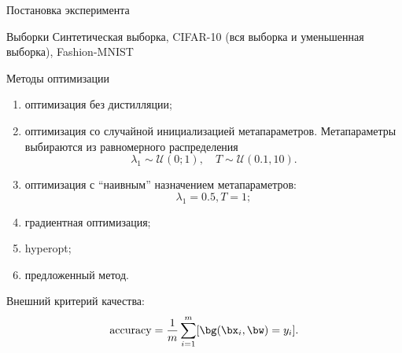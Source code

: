 \documentclass[12pt, aspectratio=169]{beamer}
\begin{document}




\begin{frame}{Постановка эксперимента}
    

\vspace{-0.35 cm}
\begin{block}{Выборки}
    Синтетическая выборка, CIFAR-10 (вся выборка и уменьшенная выборка), Fashion-MNIST
\end{block}

\vspace{-0.2 cm}
\begin{block}{Методы оптимизации}
\fontsize{11}{5}\selectfont
\begin{enumerate}[{1)}]
    \item оптимизация без дистилляции;
    \item оптимизация со случайной инициализацией метапараметров. Метапараметры выбираются из равномерного распределения
    \vspace{-0.3 cm}
    $$\lambda_1 \sim \mathcal{U}(0;1), \quad T \sim \mathcal{U}(0.1, 10).$$
    \vspace{-0.7 cm}
    \item оптимизация с ``наивным'' назначением метапараметров:
    \vspace{-0.3 cm}
    $$\lambda_1 = 0.5, T = 1;$$
    \vspace{-0.7 cm}
    \item градиентная оптимизация;
    \item hyperopt;
    \item предложенный метод.
\end{enumerate}
\end{block}
    
\fontsize{11}{5}\selectfont
\vspace{-0.1 cm}
Внешний критерий качества:
\vspace{-0.4 cm}
\begin{equation*}
    \text{accuracy} = \frac{1}{m}\sum\limits_{i=1}^m [\bg(\bx_i, \bw) = y_i].
\end{equation*}
    
\end{frame}
\end{document}
